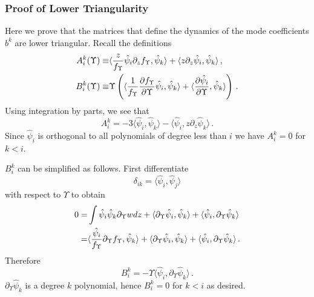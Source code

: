 \subsubsection{Proof of Lower Triangularity}\label{lower_triang}
Here we prove that the matrices that define the dynamics of the mode coefficients $b^k$ are lower triangular.  Recall the definitions
\begin{align}
A^k_i(\Upsilon)\equiv&\langle\frac{z}{f_\Upsilon }\hat\psi_i\partial_zf_\Upsilon ,\hat\psi_k\rangle+\langle z\partial_z \hat\psi_i,\hat\psi_k\rangle\,,\\
B^k_i(\Upsilon)\equiv &\Upsilon\left(\langle\frac{1}{f_\Upsilon }\frac{\partial f_\Upsilon }{\partial\Upsilon}\hat\psi_i,\hat\psi_k\rangle+\langle\frac{\partial\hat{\psi}_i}{\partial \Upsilon},\hat\psi_k\rangle\right)\,.\notag
\end{align}
Using integration by parts, we see that
\begin{equation}
A^k_i=-3\langle\hat\psi_i,\hat\psi_k\rangle-\langle \hat \psi_i,z\partial_z\hat\psi_k\rangle\,.
\end{equation}
Since $\hat\psi_i$ is orthogonal to all polynomials of degree less than $i$ we have $A^k_i=0$ for  $k<i$.  

$B^k_i$ can be simplified as follows.  First differentiate 
\begin{equation}
\delta_{ik}=\langle \hat\psi_i,\hat\psi_j\rangle
\end{equation}
with respect to $\Upsilon$ to obtain
\begin{align}
0=&\int \hat\psi_i\hat\psi_k\partial_{\Upsilon}wdz+\langle \partial_{\Upsilon}\hat\psi_i,\hat\psi_k\rangle+\langle \hat\psi_i,\partial_{\Upsilon}\hat\psi_k\rangle\\
=&\langle\frac{\hat\psi_i}{f_\Upsilon}\partial_{\Upsilon}f_\Upsilon,\hat\psi_k \rangle+\langle\partial_{\Upsilon}\hat\psi_i,\hat\psi_k\rangle+\langle \hat\psi_i,\partial_{\Upsilon}\hat\psi_k\rangle\,.\notag
\end{align}
Therefore 
\begin{equation}
B^k_i=-\Upsilon\langle\hat\psi_i,\partial_{\Upsilon}\hat\psi_k\rangle\,.
\end{equation}
$\partial_\Upsilon \hat\psi_k$ is a degree $k$ polynomial, hence $B_i^k=0$ for $k<i$ as desired.

